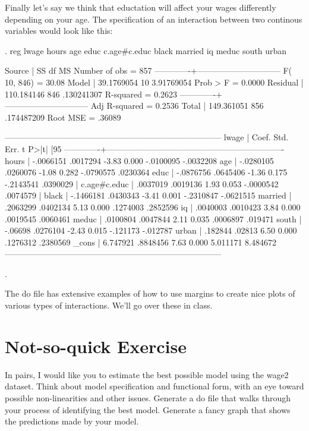 \documentclass[12pt]{article}
\begin{document}
Finally let's say we think that eductation will affect your wages
differently depending on your age. The specification of an interaction
between two continous variables would look like this: 


\begin{stlog}
  
. reg lwage hours age educ c.age#c.educ black married iq meduc south urban 

      Source |       SS       df       MS              Number of obs =     857
-------------+------------------------------           F( 10,   846) =   30.08
       Model |  39.1769054    10  3.91769054           Prob > F      =  0.0000
    Residual |  110.184146   846  .130241307           R-squared     =  0.2623
-------------+------------------------------           Adj R-squared =  0.2536
       Total |  149.361051   856  .174487209           Root MSE      =  .36089

------------------------------------------------------------------------------
       lwage |      Coef.   Std. Err.      t    P>|t|     [95%
-------------+----------------------------------------------------------------
       hours |  -.0066151   .0017294    -3.83   0.000    -.0100095   -.0032208
         age |  -.0280105   .0260076    -1.08   0.282    -.0790575    .0230364
        educ |  -.0876756   .0645406    -1.36   0.175    -.2143541    .0390029
             |
c.age#c.educ |   .0037019   .0019136     1.93   0.053    -.0000542    .0074579
             |
       black |  -.1466181   .0430343    -3.41   0.001    -.2310847   -.0621515
     married |   .2063299   .0402134     5.13   0.000     .1274003    .2852596
          iq |   .0040003   .0010423     3.84   0.000     .0019545    .0060461
       meduc |   .0100804   .0047844     2.11   0.035     .0006897     .019471
       south |    -.06698   .0276104    -2.43   0.015     -.121173    -.012787
       urban |    .182844     .02813     6.50   0.000     .1276312    .2380569
       _cons |   6.747921   .8848456     7.63   0.000     5.011171    8.484672
------------------------------------------------------------------------------

. 
\end{stlog}

The do file has extensive examples of how to use margins to create
nice plots of various types of interactions. We'll go over these in class.

\section{Not-so-quick Exercise}
\label{sec:not-so-quick}

In pairs, I would like you to estimate the best possible model using
the wage2 dataset. Think about model specification and functional
form, with an eye toward possible non-linearities and other
issues. Generate a do file that walks through your process of
identifying the best model.  Generate a fancy graph that shows the
predictions made by your model. 
\end{document}
